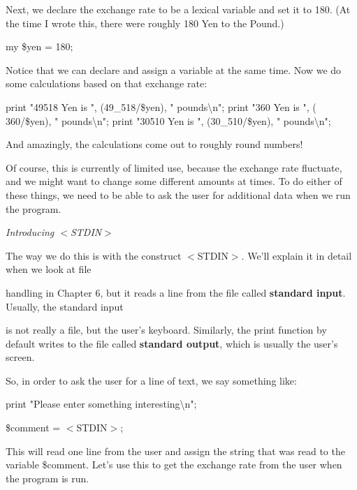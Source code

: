 \documentclass[a4paper,11pt]{book}
\begin{document}
\noindent Next, we declare the exchange rate to be a lexical variable and set it to 180. (At the time I wrote this, there were roughly 180 Yen to the Pound.)

\noindent 

\noindent my \$yen = 180;

\noindent 

\noindent Notice that we can declare and assign a variable at the same time. Now we do some calculations based on that exchange rate:

\noindent 

\noindent print "49518 Yen is ", (49\_518/\$yen), " pounds\textbackslash n"; print "360 Yen is ", ( 360/\$yen), " pounds\textbackslash n"; print "30510 Yen is ", (30\_510/\$yen), " pounds\textbackslash n";

\noindent 

\noindent And amazingly, the calculations come out to roughly round numbers!

\noindent 

\noindent Of course, this is currently of limited use, because the exchange rate fluctuate, and we might want to change some different amounts at times. To do either of these things, we need to be able to ask the user for additional data when we run the program.

\noindent 

\noindent \textit{Introducing $<$STDIN$>$}

\noindent The way we do this is with the construct $<$STDIN$>$. We'll explain it in detail when we look at file

\noindent handling in Chapter 6, but it reads a line from the file called \textbf{standard input}. Usually, the standard input

\noindent is not really a file, but the user's keyboard. Similarly, the print function by default writes to the file called \textbf{standard output}, which is usually the user's screen.

\noindent 

\noindent So, in order to ask the user for a line of text, we say something like:

\noindent 

\noindent print "Please enter something interesting\textbackslash n";

\noindent \$comment = $<$STDIN$>$;

\noindent 

\noindent This will read one line from the user and assign the string that was read to the variable \$comment. Let's use this to get the exchange rate from the user when the program is run.
\end{document}
